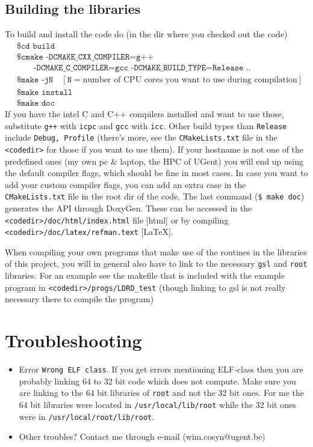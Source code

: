 \documentclass[11pt]{article}
\begin{document}
\subsection{Building the libraries}
To build 
and install the code do (in the dir where you checked 
out the code)
\begin{align*}
    & \texttt{\$ cd build} \\
	& \texttt{\$ cmake -DCMAKE\_CXX\_COMPILER=g++}\\
 &\qquad \texttt{-DCMAKE\_C\_COMPILER=gcc 
-DCMAKE\_BUILD\_TYPE=Release ..} \\
	& \texttt{\$ make -jN}\quad [\texttt{N}= \text{number of CPU cores you 
want 
to use during compilation}]\\
	& \texttt{\$ make install } \\
	& \texttt{\$ make doc } 
\end{align*}
If you have the intel C and C++ compilers installed and want to use those, 
substitute \texttt{g++} 
with \texttt{icpc} and \texttt{gcc} with \texttt{icc}.  Other build types than 
\texttt{Release} include \texttt{Debug, Profile} (there's more, see the 
\texttt{CMakeLists.txt} file in the \texttt{<codedir>} for those if you want to 
use 
them). 
If your hostname is not one of 
the predefined ones (my own pc \& laptop, the HPC of UGent) you will end up 
using the default compiler flags, which should be fine in most cases.  In case 
you want to add your custom compiler flags, you can add an extra case in the 
\texttt{CMakeLists.txt} file in the root dir of the code.  The last command 
(\texttt{\$ make doc}) generates the API through DoxyGen.  These can be 
accessed in 
the \texttt{<codedir>/doc/html/index.html} file [html] or by compiling 
\texttt{<codedir>/doc/latex/refman.text} [\LaTeX].

When compiling your own programs that make use of the routines in the libraries 
of this project, you will in general also have to link to the necessary 
\texttt{gsl} and \texttt{root} libraries.  For an example see the makefile 
that is included with the example program in 
\texttt{<codedir>/progs/LDRD\_test} (though linking to gsl is not really 
necessary there to compile the program)


\section{Troubleshooting}
\begin{itemize}
\item Error \texttt{Wrong ELF class}. If you get errors mentioning ELF-class 
then you are probably linking 64 to 32 bit code which does not compute. Make 
sure you are linking to the 64 bit libraries of \texttt{root} and not the 32 bit 
ones. For me the 64 bit libraries were located in \texttt{/usr/local/lib/root} 
while the 32 bit ones were in \texttt{/usr/local/root/lib/root}. 
\item Other troubles? Contact me through e-mail (wim.cosyn@ugent.be)
\end{itemize}
\end{document}
